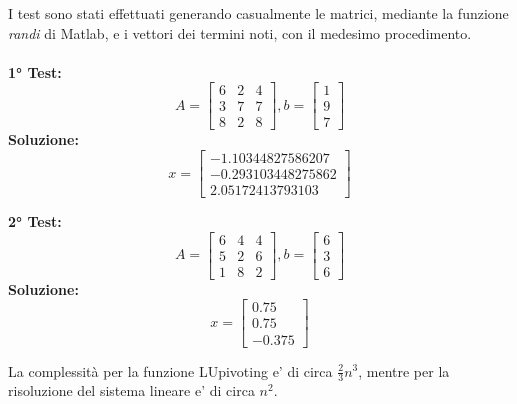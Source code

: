 \documentclass[10pt,a4paper]{article}
\begin{document}
I test sono stati effettuati generando casualmente le matrici, mediante la funzione \textit{randi} di Matlab, e i vettori dei termini noti,
con il medesimo procedimento.
\\ \\
\textbf{1° Test:}
\[
  A =
  \begin{bmatrix}
    6 & 2 & 4 \\
    3 & 7 & 7 \\
    8 & 2 & 8
  \end{bmatrix},
  b =
  \begin{bmatrix}
    1 \\ 9 \\ 7
  \end{bmatrix}
\]
\textbf{Soluzione:}
\[
  x =
  \begin{bmatrix}
    -1.10344827586207  \\
    -0.293103448275862 \\
    2.05172413793103
  \end{bmatrix}
\]

\textbf{2° Test:}
\[
  A =
  \begin{bmatrix}
    6 & 4 & 4 \\
    5 & 2 & 6 \\
    1 & 8 & 2
  \end{bmatrix},
  b =
  \begin{bmatrix}
    6 \\ 3 \\ 6
  \end{bmatrix}
\]
\textbf{Soluzione:}
\[
  x =
  \begin{bmatrix}
    0.75 \\
    0.75 \\
    -0.375
  \end{bmatrix}
\]

La complessità per la funzione LUpivoting e' di circa $ \frac{2}{3}n^3 $, mentre per la risoluzione del sistema lineare e' di circa $ n^2 $.
\end{document}
